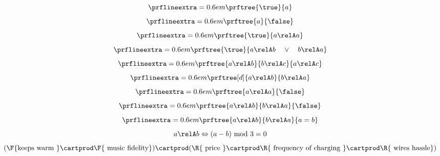 {\begin{forslides}
\begin{equation}
        \end{equation}
        \begin{equation}
            \label{eq:top1}
            \prflineextra=0.6em
            \prftree{\true}{a}
        \end{equation}
        \begin{equation}
            \label{eq:bot1}
            \prflineextra=0.6em
            \prftree{a}{\false}
        \end{equation}
        \begin{equation}
            \label{eq:rel_refl}
            \prflineextra=0.6em
            \prftree{\true}{a\relA a}
        \end{equation}
        \begin{equation}
            \label{eq:rel_tot}
            \prflineextra=0.6em
            \prftree{\true}{a\relA b \quad \vee \quad b\relA a}
        \end{equation}
        \begin{equation}
            \label{eq:rel_tran}
            \prflineextra=0.6em
            \prftree{a\relA b}{b\relA c}{a\relA c}
        \end{equation}
        \begin{equation}
            \label{eq:rel_sym}
            \prflineextra=0.6em
            \prftree[d]{a \relA b}{b\relA a}
        \end{equation}
        \begin{equation}
            \label{eq:rel_irr}
            \prflineextra=0.6em
            \prftree{a \relA a}{\false}
        \end{equation}
        \begin{equation}
            \label{eq:rel_asy}
            \prflineextra=0.6em
            \prftree{a \relA b}{b\relA a}{\false}
        \end{equation}
        \begin{equation}
            \label{eq:rel_antisy}
            \prflineextra=0.6em
            \prftree{a \relA b}{b\relA a}{a=b}
        \end{equation}
        \begin{equation}
            \label{eq:ex}
            a\relA b \Leftrightarrow (a-b) \text{ mod }3=0
        \end{equation}
        \begin{equation}
            \label{eq:fun_cost}
            (\F{\text{keeps warm }}\cartprod \F{\text{ music fidelity}})\cartprod(\R{\text{ price }} \cartprod \R{\text{ frequency of charging }}\cartprod \R{\text{ wires hassle}})

\end{equation}
\end{forslides}}
